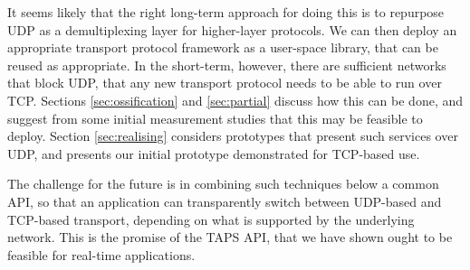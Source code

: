 \documentclass[10pt]{sig-alternate-05-2015}
\begin{document}
It seems likely that the right long-term approach for doing this is to
repurpose UDP as a demultiplexing layer for higher-layer protocols. We can
then deploy an appropriate transport protocol framework as a user-space
library, that can be reused as appropriate. In the short-term, however, 
there are sufficient networks that block UDP, that any new transport
protocol needs to be able to run over TCP. Sections \ref{sec:ossification}
and \ref{sec:partial} discuss how this can be done, and suggest from some
initial measurement studies that this may be feasible to deploy. Section
\ref{sec:realising} considers prototypes that present such services over
UDP, and presents our initial prototype demonstrated for TCP-based use.

The challenge for the future is in combining such techniques below a common
API, so that an application can transparently switch between UDP-based and
TCP-based transport, depending on what is supported by the underlying
network. This is the promise of the TAPS API, that we have shown ought to
be feasible for real-time applications.


%
%


\end{document}

